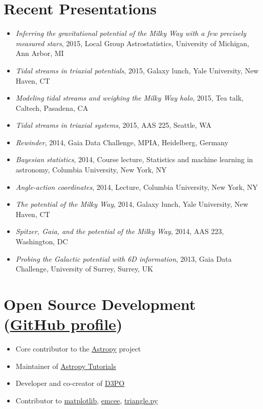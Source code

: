 \documentclass[12pt,letterpaper]{article}
\begin{document}
\section*{Recent Presentations}

\begin{itemize}
        \item \emph{Inferring the gravitational potential of the Milky Way with a few precisely measured stars}, 2015, Local Group Astrostatistics, University of Michigan, Ann Arbor, MI
        \item \emph{Tidal streams in triaxial potentials}, 2015, Galaxy lunch, Yale University, New Haven, CT
	\item \emph{Modeling tidal streams and weighing the Milky Way halo}, 2015, Tea talk, Caltech, Pasadena, CA
	\item \emph{Tidal streams in triaxial systems}, 2015, AAS 225, Seattle, WA
	\item \emph{Rewinder}, 2014, Gaia Data Challenge, MPIA, Heidelberg, Germany
	\item \emph{Bayesian statistics}, 2014, Course lecture, Statistics and machine learning in astronomy, Columbia University, New York, NY
	\item \emph{Angle-action coordinates}, 2014, Lecture, Columbia University, New York, NY
	\item \emph{The potential of the Milky Way}, 2014, Galaxy lunch, Yale University, New Haven, CT
	\item \emph{Spitzer, Gaia, and the potential of the Milky Way}, 2014, AAS 223, Washington, DC
	\item \emph{Probing the Galactic potential with 6D information}, 2013, Gaia Data Challenge, University of Surrey, Surrey, UK

\end{itemize}

\section*{Open Source Development (\href{https://github.com/adrn}{GitHub profile})}
\begin{itemize}
	
	\item Core contributor to the \href{http://www.astropy.org/}{Astropy} project
	\item Maintainer of \href{http://tutorials.astropy.org/}{Astropy Tutorials}
	\item Developer and co-creator of \href{http://d3po.org}{D3PO}
	\item Contributor to \href{http://matplotlib.org/}{matplotlib}, \href{http://dan.iel.fm/emcee/current/}{emcee}, \href{https://github.com/dfm/triangle.py}{triangle.py}

\end{itemize}
\end{document}
